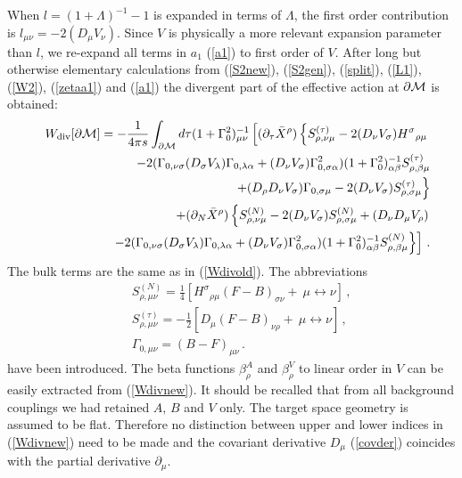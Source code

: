 \documentclass[a4paper,12pt]{article}
\begin{document}
When $l=(1+\Lambda )^{-1}-1$ is expanded in terms of $\Lambda$,
the first order contribution is  $l_{\mu\nu}=
-2(D_\mu V_\nu )$. Since $V$ is physically a more relevant
expansion parameter than $l$, we re-expand all terms in $a_1$ (\ref{a1})
to first order of $V$. After long but otherwise elementary
calculations from (\ref{S2new}), (\ref{S2gen}),
(\ref{split}), (\ref{L1}), (\ref{W2}), (\ref{zetaa1}) and
(\ref{a1}) the divergent part of the effective action at $\partial{\cal M}$
is obtained:
\begin{eqnarray}
&&W_{{\mbox {\scriptsize {div}}}}[\partial{\cal M}]=-\frac 1{4\pi s}
\int_{\partial{\cal M}} d\tau (1+\Gamma_0^2)_{\mu\nu}^{-1}
\left[ (\partial_\tau \bar X^\rho ) \left\{
S^{(\tau )}_{\rho ,\nu\mu} -2 (D_\nu V_\sigma ){H^\sigma}_{\rho\mu}
\right.\right. \nonumber \\
&& \qquad\qquad
-2 (\Gamma_{0,\nu\sigma} (D_\sigma V_\lambda ) 
\Gamma_{0,\lambda\alpha} + (D_\nu V_\sigma )
\Gamma^2_{0,\sigma\alpha}) (1+\Gamma_0^2)^{-1}_{\alpha\beta}
S^{(\tau)}_{\rho ,\beta \mu} \nonumber \\
&& \qquad\qquad \left. +(D_\rho D_\nu V_\sigma )\Gamma_{0,\sigma\mu}
-2 (D_\nu V_\sigma )S^{(\tau )}_{\rho ,\sigma\mu} \right\}
\nonumber \\
&& \qquad\qquad +(\partial_N \bar X^\rho )\left\{ S^{(N )}_{\rho ,\nu\mu}
-2 (D_\nu V_\sigma )S^{(N )}_{\rho ,\sigma\mu} 
+(D_\nu D_\mu V_\rho ) 
\right. \nonumber \\
&& \qquad\qquad \left.\left.
-2 (\Gamma_{0,\nu\sigma} (D_\sigma V_\lambda ) 
\Gamma_{0,\lambda\alpha} + (D_\nu V_\sigma )
\Gamma^2_{0,\sigma\alpha}) (1+\Gamma_0^2)^{-1}_{\alpha\beta}
S^{(N)}_{\rho ,\beta \mu} \right\} \right] \,. \label{Wdivnew}
\end{eqnarray}
The bulk  terms are the same as
in (\ref{Wdivold}). The abbreviations
\begin{eqnarray}
&&S^{(N)}_{\rho ,\mu\nu} =\frac 14 [ {H^\sigma}_{\rho\mu}
(F-B)_{\sigma\nu} + \ \mu \leftrightarrow \nu  ] \,,
\nonumber \\
&&S^{(\tau )}_{\rho ,\mu\nu}=-\frac 12 [ D_\mu (F-B)_{\nu\rho}
+ \ \mu \leftrightarrow \nu  ] \,,\nonumber \\
&&\Gamma_{0,\mu\nu}= (B-F)_{\mu\nu} \,. \label{nots}
\end{eqnarray}
have been introduced.
The beta functions $\beta_\rho^A$ and $\beta_\rho^V$ 
to linear order in $V$ can be
easily extracted from (\ref{Wdivnew}). It should be recalled that
from all background couplings we had retained $A$, $B$ and $V$
only. The target space geometry is assumed to be flat.
Therefore no distinction between upper and lower
indices in (\ref{Wdivnew}) need to be made and the
covariant derivative $D_\mu$ (\ref{covder}) coincides with
the partial derivative $\partial_\mu$.
\end{document}

